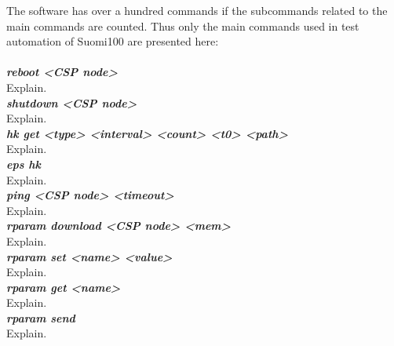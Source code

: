 \documentclass[english,12pt,a4paper,pdftex,elec,utf8]{aaltothesis}
\begin{document}
The software has over a hundred commands if the subcommands related to the main commands are counted. Thus only the main commands used in test automation of Suomi100 are presented here:\\
\\
\textit{\textbf{reboot <CSP node>}}\\
Explain.\\
\textit{\textbf{shutdown <CSP node>}}\\
Explain.\\ 
\textit{\textbf{hk get <type> <interval> <count> <t0> <path>}}\\
Explain.\\
\textit{\textbf{eps hk}}\\
Explain.\\ 
\textit{\textbf{ping <CSP node> <timeout>}}\\
Explain.\\
\textit{\textbf{rparam download <CSP node> <mem>}}\\
Explain.\\ 
\textit{\textbf{rparam set <name> <value>}}\\
Explain.\\ 
\textit{\textbf{rparam get <name>}}\\
Explain.\\ 
\textit{\textbf{rparam send}}\\
Explain.\\
\end{document}
